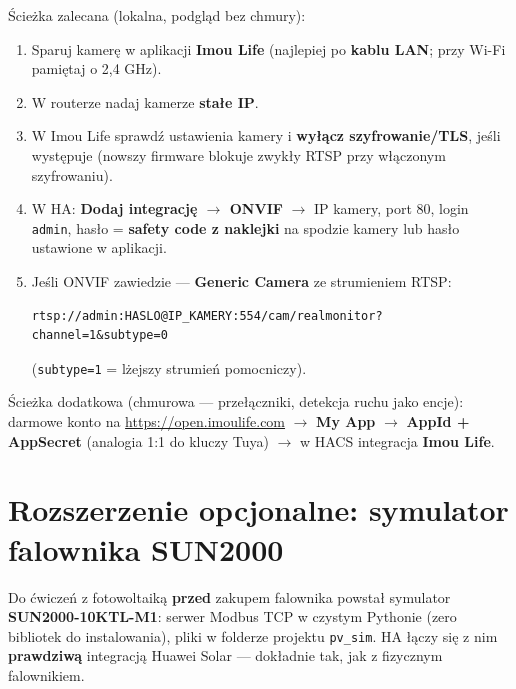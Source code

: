 \documentclass[11pt,a4paper]{article}
\begin{document}
Ścieżka zalecana (lokalna, podgląd bez chmury):
\begin{enumerate}
\item Sparuj kamerę w aplikacji \textbf{Imou Life} (najlepiej po \textbf{kablu LAN}; przy Wi-Fi pamiętaj o 2,4 GHz).
\item W routerze nadaj kamerze \textbf{stałe IP}.
\item W Imou Life sprawdź ustawienia kamery i \textbf{wyłącz szyfrowanie/TLS}, jeśli występuje (nowszy firmware blokuje zwykły RTSP przy włączonym szyfrowaniu).
\item W HA: \textbf{Dodaj integrację $\to$ ONVIF} $\to$ IP kamery, port 80, login \texttt{admin}, hasło = \textbf{safety code z naklejki} na spodzie kamery lub hasło ustawione w aplikacji.
\item Jeśli ONVIF zawiedzie --- \textbf{Generic Camera} ze strumieniem RTSP:
\begin{lstlisting}
rtsp://admin:HASLO@IP_KAMERY:554/cam/realmonitor?channel=1&subtype=0
\end{lstlisting}
(\texttt{subtype=1} = lżejszy strumień pomocniczy).
\end{enumerate}

Ścieżka dodatkowa (chmurowa --- przełączniki, detekcja ruchu jako encje): darmowe konto na \url{https://open.imoulife.com} $\to$ \textbf{My App} $\to$ \textbf{AppId + AppSecret} (analogia 1:1 do kluczy Tuya) $\to$ w HACS integracja \textbf{Imou Life}.

\section{Rozszerzenie opcjonalne: symulator falownika SUN2000}
\label{sec:pvsim}

Do ćwiczeń z fotowoltaiką \textbf{przed} zakupem falownika powstał symulator \textbf{SUN2000-10KTL-M1}: serwer Modbus TCP w czystym Pythonie (zero bibliotek do instalowania), pliki w folderze projektu \texttt{pv\_sim}. HA łączy się z nim \textbf{prawdziwą} integracją Huawei Solar --- dokładnie tak, jak z fizycznym falownikiem.
\end{document}
